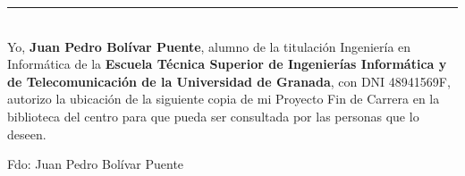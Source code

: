 \chapter*{}
\thispagestyle{empty}
\cleardoublepage

\thispagestyle{empty}



\cleardoublepage
\thispagestyle{empty}
\begin{center}
{\large\bfseries \myTitle}\\
\end{center}
\begin{center}
\myName
\end{center}
\\
\vspace{0.7cm}

\\

\cleardoublepage
\thispagestyle{empty}
\begin{center}
{\large\bfseries \myTitle}\\
\end{center}
\begin{center}
\myName
\end{center}
\\
\vspace{0.7cm}

\\


\chapter*{}
\thispagestyle{empty}

\noindent\rule[-1ex]{\textwidth}{2pt}\\[4.5ex]

Yo, \textbf{Juan Pedro Bolívar Puente}, alumno de la titulación
Ingeniería en Informática de la \textbf{Escuela Técnica Superior de
  Ingenierías Informática y de Telecomunicación de la Universidad de
  Granada}, con DNI 48941569F, autorizo la ubicación de la siguiente
copia de mi Proyecto Fin de Carrera en la biblioteca del centro para
que pueda ser consultada por las personas que lo deseen.

\vspace{6cm}
\noindent Fdo: Juan Pedro Bolívar Puente

